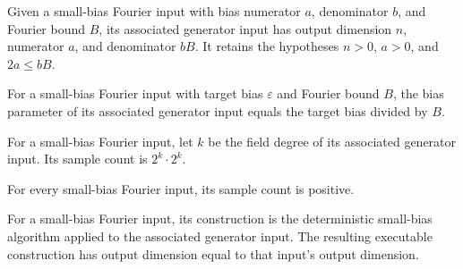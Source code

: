 \begin{definition}
\label{FABL.SmallBiasFourierInput.generatorInput}
\leanok
{}
Given a small-bias Fourier input with bias numerator $a$, denominator $b$, and Fourier
bound $B$, its associated generator input has output dimension $n$, numerator $a$, and
denominator $bB$. It retains the hypotheses $n>0$, $a>0$, and $2a\le bB$.
\end{definition}

\begin{theorem}
\label{FABL.SmallBiasFourierInput.generatorInput_epsilon}
\leanok
{}
For a small-bias Fourier input with target bias $\varepsilon$ and Fourier bound $B$, the bias
parameter of its associated generator input equals the target bias divided by $B$.
\end{theorem}

\begin{definition}
\label{FABL.SmallBiasFourierInput.sampleCount}
\leanok
{}
For a small-bias Fourier input, let $k$ be the field degree of its associated generator
input. Its sample count is $2^k\cdot 2^k$.
\end{definition}

\begin{theorem}
\label{FABL.SmallBiasFourierInput.sampleCount_pos}
\leanok
{}
For every small-bias Fourier input, its sample count is positive.
\end{theorem}

\begin{definition}
\label{FABL.SmallBiasFourierInput.construction}
\leanok
{}
For a small-bias Fourier input, its construction is the deterministic small-bias
algorithm applied to the associated generator input. The resulting executable
construction has output dimension equal to that input's output dimension.
\end{definition}

